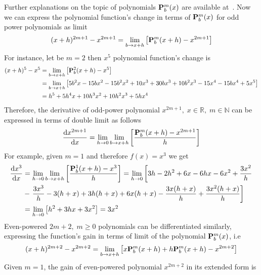 Further explanations on the topic of polynomials ${\mathbf{P}}\sp{m} \sb{b}(x)$ are available
at~\cite{AnUnusualIdentityForOddPowers2022,kolosov2023polynomial}.
Now we can express the polynomial function's change in terms of ${\mathbf{P}}\sp{m} \sb{b}(x)$ for odd power polynomials
as limit
\[
    (x+h)^{2m+1} - x^{2m+1} = \lim_{b \to x+h} \left[ {\mathbf{P}}\sp{m} \sb{b}(x+h) - x^{2m+1} \right]
\]
For instance, let be $m=2$ then $x^5$ polynomial function's change is
\begin{equation*}
    \begin{split}
    (x+h)
        ^{5} - x^{5} &= \lim_{b \to x+h} \left[ {\mathbf{P}}\sp{2} \sb{b}(x+h) - x^{5} \right] \\
        &= \lim_{b \to x+h} \left[ 5 b^2 x - 15 b x^2 - 15 b^2 x^2 + 10 x^3 + 30 b x^3 + 10 b^2 x^3 - 15 x^4 - 15 b x^4 + 5 x^5 \right] \\
        &= h^5 + 5 h^4 x + 10 h^3 x^2 + 10 h^2 x^3 + 5 h x^4
    \end{split}
\end{equation*}
Therefore, the derivative of odd-power polynomial $x^{2m+1}, \; x\in\mathbb{R}, \; m\in\mathbb{N}$ can be expressed in terms of double limit as follows
\begin{equation}
    \odv{x^{2m+1}}{x} = \lim_{h \to 0} \lim_{b \to x+h} \left[ \frac{\polynomialP{m}{b}{x+h} - x^{2m+1}}{h} \right] \label{eq:odd-power-derivative}
\end{equation}
For example, given $m=1$ and therefore $f(x) = x^3$ we get
\begin{equation*}
    \begin{split}
        \odv{x^3}{x}
        &=\lim_{h \to 0} \lim_{b \to x+h} \left[ \frac{\polynomialP{1}{b}{x+h} - x^{3}}{h} \right]
        = \lim_{h \to 0} \left[ 3 h - 2 h^2 + 6 x - 6 h x - 6 x^2 + \frac{3 x^2}{h} \right. \\
        &- \left.\frac{3 x^3}{h} - 3 (h + x) + 3 h (h + x) + 6 x (h + x)- \frac{3 x (h + x)}{h} + \frac{3 x^2 (h + x)}{h} \right] \\
        &=\lim_{h \to 0} \left[ h^2 + 3 h x + 3 x^2 \right] = 3x^2
    \end{split}
\end{equation*}
Even-powered $2m+2, \; m\geq 0$ polynomials can be differentiated similarly, expressing the function's gain in terms
of limit of the polynomial ${\mathbf{P}}\sp{m} \sb{b}(x)$, i.e
\[
    (x+h)^{2m+2} - x^{2m+2} = \lim_{b \to x+h} \left[ x{\mathbf{P}}\sp{m} \sb{b}(x+h) + h{\mathbf{P}}\sp{m} \sb{b}(x+h)  - x^{2m+2} \right]
\]
Given $m=1$, the gain of even-powered polynomial $x^{2m+2}$ in its extended form is
